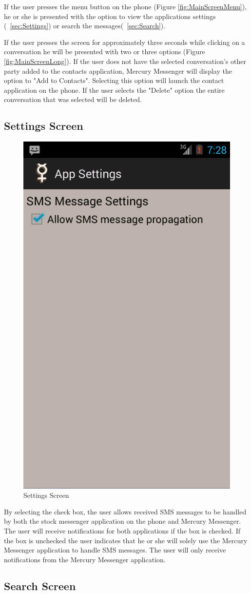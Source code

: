 \documentclass{article}
\begin{document}
\par If the user presses the menu button on the phone (Figure \ref{fig:MainScreenMenu}), he or she is presented with the option to view the applications settings (~\autoref{sec:Settings}) or search the messages(~\autoref{sec:Search}).
\par If the user presses the screen for approximately three seconds while clicking on a conversation he will be presented with two or three options (Figure \ref{fig:MainScreenLong}).
If the user does not have the selected conversation's other party added to the contacts application, Mercury Messenger will display the option to "Add to Contacts". Selecting this option will launch the contact application on the phone.
If the user selects the "Delete" option the entire conversation that was selected will be deleted.
\pagebreak
\subsection{Settings Screen}
\label{sec:Settings}

\begin{figure}[ht!]
\centering
\includegraphics[width=.25\textwidth]{"./Screen_shots/Settings_Screen"}{}
\caption{Settings Screen}
\label{fig:SettingsScreen}

\end{figure}

\par By selecting the check box, the user allows received SMS messages to be handled by both the stock messenger application on the phone and Mercury Messenger. The user will receive notifications for both applications if the box is checked.
If the box is unchecked the user indicates that he or she will solely use the Mercury Messenger application to handle SMS messages. The user will only receive notifications from the Mercury Messenger application.

\subsection{Search Screen}
\label{sec:Search}
\end{document}
